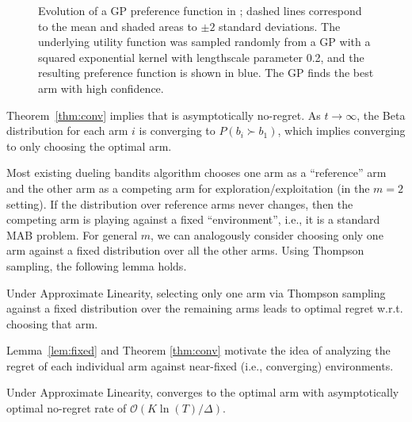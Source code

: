  
\begin{figure*}[t!]
\centering
{}
{}
\caption{Evolution of a GP preference function in \kersparring; dashed lines correspond to the mean and shaded areas to $\pm 2$ standard deviations. The underlying utility function was sampled randomly from a GP with a squared exponential kernel with lengthscale parameter 0.2, and the resulting preference function is shown in blue. The GP finds the best arm with high confidence.}
\label{fig:ks}
\end{figure*}

Theorem~\ref{thm:conv} implies that \multisparring is asymptotically no-regret. As $t\rightarrow \infty$, the Beta distribution for each arm $i$ is converging to  $P(b_i \succ b_1)$, which implies converging to only choosing the optimal arm.

Most existing dueling bandits algorithm chooses one arm as a ``reference'' arm and the other arm as a competing arm for exploration/exploitation (in the $m=2$ setting). If the distribution over reference arms never changes, then the competing arm is playing against a fixed ``environment'', i.e., it is a standard MAB problem. For general $m$, we can analogously consider choosing only one arm against a fixed distribution over all the other arms.  Using Thompson sampling, the following lemma holds.

\begin{lemma}
	\label{lem:fixed}
Under Approximate Linearity, selecting only one arm  via Thompson sampling against a fixed distribution over the remaining arms leads to optimal regret w.r.t. choosing that arm.
\end{lemma}

Lemma~\ref{lem:fixed} and Theorem \ref{thm:conv} motivate the idea of analyzing the regret of each individual arm against near-fixed (i.e.,  converging) environments. %

\begin{theorem}
\label{thm:ms}
Under Approximate Linearity, \multisparring converges to the optimal arm with asymptotically optimal no-regret rate of $\mathcal{O}(K\ln(T)/\Delta)$.
\end{theorem}

